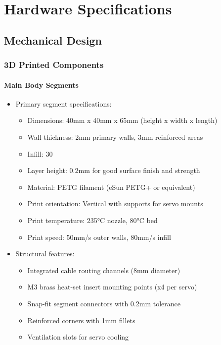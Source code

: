 \documentclass[12pt,a4paper]{report}
\begin{document}
\appendix
\chapter{Hardware Specifications}
\section{Mechanical Design}
\subsection{3D Printed Components}
\subsubsection{Main Body Segments}
\begin{itemize}
\item Primary segment specifications:
\begin{itemize}
\item Dimensions: 40mm x 40mm x 65mm (height x width x length)
\item Wall thickness: 2mm primary walls, 3mm reinforced areas
\item Infill: 30%
\item Layer height: 0.2mm for good surface finish and strength
\item Material: PETG filament (eSun PETG+ or equivalent)
\item Print orientation: Vertical with supports for servo mounts
\item Print temperature: 235°C nozzle, 80°C bed
\item Print speed: 50mm/s outer walls, 80mm/s infill
\end{itemize}
\item Structural features:
\begin{itemize}
    \item Integrated cable routing channels (8mm diameter)
    \item M3 brass heat-set insert mounting points (x4 per servo)
    \item Snap-fit segment connectors with 0.2mm tolerance
    \item Reinforced corners with 1mm fillets
    \item Ventilation slots for servo cooling
\end{itemize}
\end{itemize}
\end{document}

